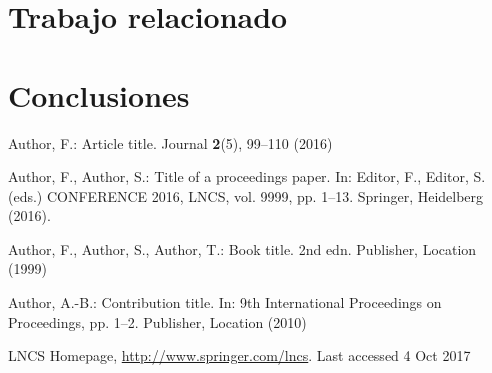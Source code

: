 \documentclass[runningheads]{llncs}
\begin{document}

\section{Trabajo relacionado}


\section{Conclusiones}


\begin{thebibliography}{8}
Author, F.: Article title. Journal \textbf{2}(5), 99--110 (2016)

Author, F., Author, S.: Title of a proceedings paper. In: Editor,
F., Editor, S. (eds.) CONFERENCE 2016, LNCS, vol. 9999, pp. 1--13.
Springer, Heidelberg (2016). 

Author, F., Author, S., Author, T.: Book title. 2nd edn. Publisher,
Location (1999)

Author, A.-B.: Contribution title. In: 9th International Proceedings
on Proceedings, pp. 1--2. Publisher, Location (2010)

LNCS Homepage, \url{http://www.springer.com/lncs}. Last accessed 4
Oct 2017
\end{thebibliography}
\end{document}

